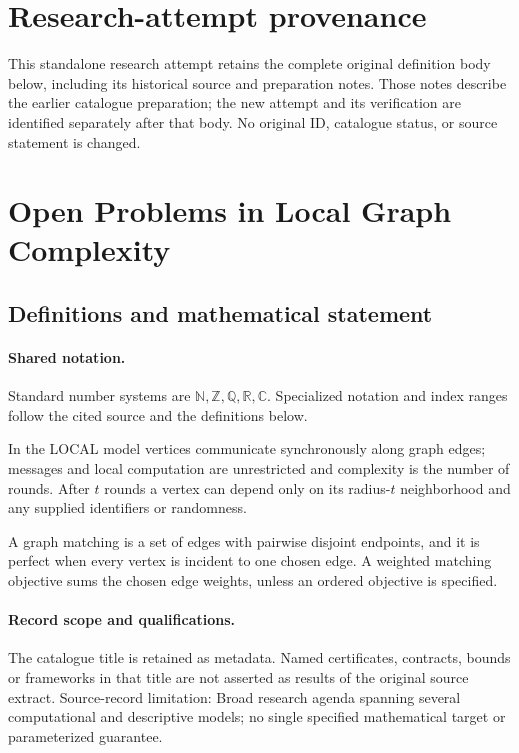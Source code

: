 \documentclass[11pt]{article}
\begin{document}
\section*{Research-attempt provenance}
This standalone research attempt retains the complete original definition body below,
including its historical source and preparation notes. Those notes describe the
earlier catalogue preparation; the new attempt and its verification are identified
separately after that body. No original ID, catalogue status, or source statement is changed.

\section{Open Problems in Local Graph Complexity}\label{statement}

\subsection{Definitions and mathematical statement}

\paragraph{Shared notation.}Standard number systems are $\mathbb N,\mathbb Z,\mathbb Q,\mathbb R,\mathbb C$. Specialized notation and index ranges follow the cited source and the definitions below.


In the LOCAL model vertices communicate synchronously along graph edges; messages and local computation are unrestricted and complexity is the number of rounds. After $t$ rounds a vertex can depend only on its radius-$t$ neighborhood and any supplied identifiers or randomness.

A graph matching is a set of edges with pairwise disjoint endpoints, and it is perfect when every vertex is incident to one chosen edge. A weighted matching objective sums the chosen edge weights, unless an ordered objective is specified.
\paragraph{Record scope and qualifications.}
The catalogue title is retained as metadata. Named certificates, contracts, bounds or frameworks in that title are not asserted as results of the original source extract.
Source-record limitation: Broad research agenda spanning several computational and descriptive models; no single specified mathematical target or parameterized guarantee.
\end{document}

